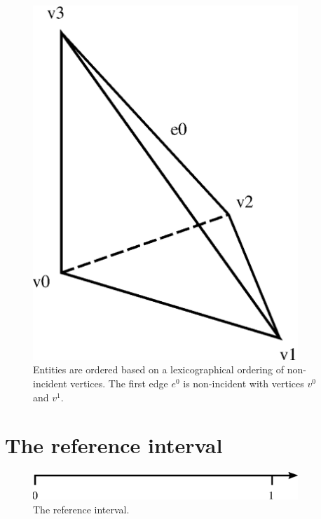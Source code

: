 \begin{figure}[H]
  \begin{center}
    \includegraphics[width=10cm]{eps/ordering_example_tetrahedron.eps}
    \caption{Entities are ordered based on a lexicographical ordering
      of non-incident vertices. The first edge $e^0$ is non-incident
      with vertices $v^0$ and $v^1$.}
    \label{fig:orderingexample}
  \end{center}
\end{figure}

\newpage
\section{The reference interval}

\begin{figure}[H]
  \begin{center}
    \includegraphics[width=10cm]{eps/interval.eps}
    \caption{The reference interval.}
  \end{center}
\end{figure}

